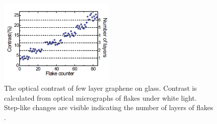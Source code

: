 \documentclass[12pt,titlepage]{article}
\begin{document}
	\begin{figure}
		\centering
		\includegraphics[width=0.5\textwidth]{figures/contrast.png}
		\caption[Determination of thickness using optical contrast.]{The optical contrast of few layer graphene on glass. Contrast is calculated from optical micrographs of flakes under white light. Step-like changes are visible indicating the number of layers of flakes \cite{Khrapach2012a}.}
		\label{fig:contrast}
	\end{figure}
	
\end{document}
